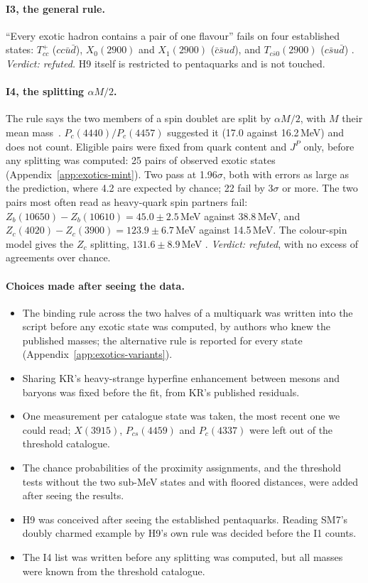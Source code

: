 \paragraph{I3, the general rule.} ``Every exotic hadron contains a pair of one flavour'' fails on four established states:
$T_{cc}^+$ ($cc\bar u\bar d$), $X_0(2900)$ and $X_1(2900)$ ($\bar c\bar sud$), and $T_{c\bar s0}(2900)$ ($c\bar su\bar d$) .
\emph{Verdict: refuted.} H9 itself is restricted to pentaquarks and is not touched.

\paragraph{I4, the splitting $\alpha M/2$.} The rule says the two members of a spin doublet are split by $\alpha M/2$, with $M$ their mean
mass~\cite{codata2022}. $P_c(4440)/P_c(4457)$ suggested it (17.0 against 16.2\,MeV) and does not count. Eligible pairs were fixed from
quark content and $J^P$ only, before any splitting was computed: 25 pairs of observed exotic states (Appendix~\ref{app:exotics-mint}).
Two pass at 1.96$\sigma$, both with errors as large as the prediction, where 4.2 are expected by chance; 22 fail by $3\sigma$ or more.
The two pairs most often read as heavy-quark spin partners fail: $Z_b(10650)-Z_b(10610)=45.0\pm2.5$\,MeV against 38.8\,MeV, and
$Z_c(4020)-Z_c(3900)=123.9\pm6.7$\,MeV against 14.5\,MeV. The colour-spin model gives the $Z_c$ splitting, $131.6\pm8.9$\,MeV
. \emph{Verdict: refuted}, with no excess of agreements over chance.

\paragraph{Choices made after seeing the data.}
\begin{itemize}[leftmargin=*,itemsep=1pt]
\item The binding rule across the two halves of a multiquark was written into the script before any exotic state was computed, by
authors who knew the published masses; the alternative rule is reported for every state (Appendix~\ref{app:exotics-variants}).
\item Sharing KR's heavy-strange hyperfine enhancement between mesons and baryons was fixed before the fit, from KR's published
residuals.
\item One measurement per catalogue state was taken, the most recent one we could read; $X(3915)$, $P_{cs}(4459)$ and $P_c(4337)$ were left
out of the threshold catalogue.
\item The chance probabilities of the proximity assignments, and the threshold tests without the two sub-MeV states and with floored
distances, were added after seeing the results.
\item H9 was conceived after seeing the established pentaquarks. Reading SM7's doubly charmed example by H9's own rule was decided
before the I1 counts.
\item The I4 list was written before any splitting was computed, but all masses were known from the threshold catalogue.
\end{itemize}

